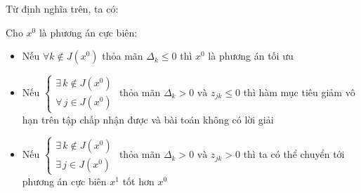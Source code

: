 \documentclass[12pt,a4paper]{article}\author{Nguyễn Nho Dũng}
\begin{document}
Từ định nghĩa trên, ta có:
\begin{dly}
	Cho $x^0$ là phương án cực biên:
	\begin{itemize}
		\item Nếu $\forall k\notin J(x^0)$ thỏa mãn $\Delta_k \le 0$ thì $x^0$ là phương án tối ưu
		\item Nếu $\begin{cases}
			\exists\, k\notin J(x^0)\\
			\forall\, j\in J(x^0)
		\end{cases}$ thỏa mãn $\Delta_k > 0 \text{ và } z_{jk} \le 0$ thì hàm mục tiêu giảm vô hạn trên tập chấp nhận được và bài toán không có lời giải
		\item Nếu $\begin{cases}
			\exists\, k\notin J(x^0)\\
			\exists\, j\in J(x^0)
		\end{cases}$ thỏa mãn $\Delta_k > 0 \text{ và } z_{jk} > 0$ thì ta có thể chuyển tới phương án cực biên $x^1$ tốt hơn $x^0$
	\end{itemize}
\end{dly}
\end{document}
